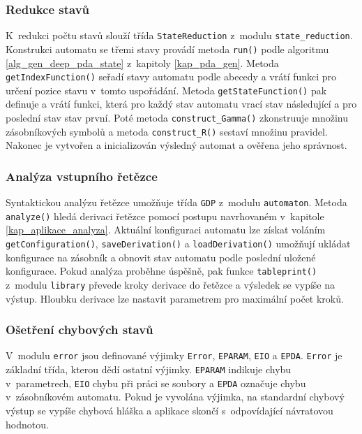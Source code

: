 \subsubsection{Redukce stavů}

K~redukci počtu stavů slouží třída \texttt{StateReduction} z~modulu \texttt{state\_reduction}. Konstrukci automatu se třemi stavy provádí metoda \texttt{run()} podle algoritmu \ref{alg_gen_deep_pda_state} z~kapitoly \ref{kap_pda_gen}. Metoda \texttt{getIndexFunction()} seřadí stavy automatu podle abecedy a vrátí funkci pro určení pozice stavu v~tomto uspořádání. Metoda \texttt{getStateFunction()} pak definuje a vrátí funkci, která pro každý stav automatu vrací stav následující a pro poslední stav stav první. Poté metoda \texttt{construct\_Gamma()} zkonstruuje množinu zásobníkových symbolů a metoda \texttt{construct\_R()} sestaví množinu pravidel. Nakonec je vytvořen a inicializován výsledný automat a ověřena jeho správnost.

\subsubsection{Analýza vstupního řetězce}
Syntaktickou analýzu řetězce umožňuje třída \texttt{GDP} z~modulu \texttt{automaton}. Metoda \texttt{analyze()} hledá derivaci řetězce pomocí postupu navrhovaném v~kapitole \ref{kap_aplikace_analyza}. Aktuální konfiguraci automatu lze získat voláním \texttt{getConfiguration()}, \texttt{saveDerivation()} a \texttt{loadDerivation()} umožňují ukládat konfigurace na zásobník a obnovit stav automatu podle poslední uložené konfigurace. Pokud analýza proběhne úspěšně, pak funkce \texttt{tableprint()} z~modulu \texttt{library} převede kroky derivace do řetězce a výsledek se vypíše na výstup. Hloubku derivace lze nastavit parametrem pro maximální počet kroků.

\subsubsection{Ošetření chybových stavů}

V~modulu \texttt{error} jsou definované výjimky \texttt{Error}, \texttt{EPARAM}, \texttt{EIO} a \texttt{EPDA}. \texttt{Error} je základní třída, kterou dědí ostatní výjimky. \texttt{EPARAM} indikuje chybu v~parametrech, \texttt{EIO} chybu při práci se soubory a \texttt{EPDA} označuje chybu v~zásobníkovém automatu. Pokud je vyvolána výjimka, na standardní chybový výstup se vypíše chybová hláška a aplikace skončí s~odpovídající návratovou hodnotou.

